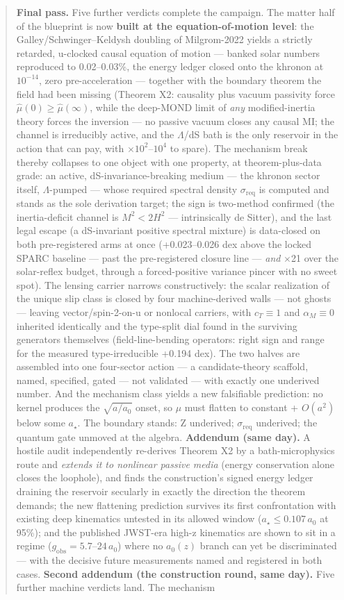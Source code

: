 \documentclass[11pt,a4paper]{article}
\begin{document}
\begin{abstract}
\textbf{Final pass.} Five further verdicts complete the campaign. The matter half of the blueprint is now \textbf{built at the equation-of-motion level}: the Galley/Schwinger--Keldysh doubling of Milgrom-2022 yields a strictly retarded, u-clocked causal equation of motion --- banked solar numbers reproduced to 0.02--0.03\%, the energy ledger closed onto the khronon at $10^{-14}$, zero pre-acceleration --- together with the boundary theorem the field had been missing (Theorem X2: causality plus vacuum passivity force $\hat\mu(0) \ge \hat\mu(\infty)$, while the deep-MOND limit of \emph{any} modified-inertia theory forces the inversion --- no passive vacuum closes any causal MI; the channel is irreducibly active, and the $\Lambda$/dS bath is the only reservoir in the action that can pay, with $\times10^{2}$--$10^{4}$ to spare). The mechanism break thereby collapses to one object with one property, at theorem-plus-data grade: an active, dS-invariance-breaking medium --- the khronon sector itself, $\Lambda$-pumped --- whose required spectral density $\sigma_{\mathrm{req}}$ is computed and stands as the sole derivation target; the sign is two-method confirmed (the inertia-deficit channel is $M^2 < 2H^2$ --- intrinsically de Sitter), and the last legal escape (a dS-invariant positive spectral mixture) is data-closed on both pre-registered arms at once (+0.023--0.026 dex above the locked SPARC baseline --- past the pre-registered closure line --- \emph{and} $\times$21 over the solar-reflex budget, through a forced-positive variance pincer with no sweet spot). The lensing carrier narrows constructively: the scalar realization of the unique slip class is closed by four machine-derived walls --- not ghosts --- leaving vector/spin-2-on-u or nonlocal carriers, with $c_T \equiv 1$ and $\alpha_M \equiv 0$ inherited identically and the type-split dial found in the surviving generators themselves (field-line-bending operators: right sign and range for the measured type-irreducible +0.194 dex). The two halves are assembled into one four-sector action --- a candidate-theory scaffold, named, specified, gated --- not validated --- with exactly one underived number. And the mechanism class yields a new falsifiable prediction: no kernel produces the $\sqrt{a/a_0}$ onset, so $\mu$ must flatten to constant + $O(a^2)$ below some $a_\star$. The boundary stands: Z underived; $\sigma_{\mathrm{req}}$ underived; the quantum gate unmoved at the algebra. \textbf{Addendum (same day).} A hostile audit independently re-derives Theorem X2 by a bath-microphysics route and \emph{extends it to nonlinear passive media} (energy conservation alone closes the loophole), and finds the construction's signed energy ledger draining the reservoir secularly in exactly the direction the theorem demands; the new flattening prediction survives its first confrontation with existing deep kinematics untested in its allowed window ($a_\star \le 0.107\,a_0$ at 95\%); and the published JWST-era high-z kinematics are shown to sit in a regime ($g_{\mathrm{obs}} = 5.7$--$24\,a_0$) where no $a_0(z)$ branch can yet be discriminated --- with the decisive future measurements named and registered in both cases. \textbf{Second addendum (the construction round, same day).} Five further machine verdicts land. The mechanism 
\end{abstract}
\end{document}
